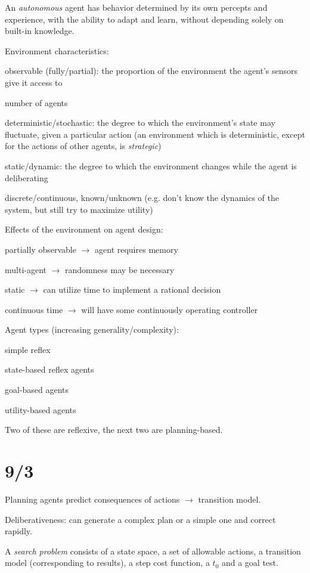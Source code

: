 \documentclass[12pt]{article}
\begin{document}
An \textit{autonomous} agent has behavior determined by its own percepts and experience, with the ability to adapt and learn, without depending solely on built-in knowledge.

\noindent
Environment characteristics:

observable (fully/partial): the proportion of the environment the agent's sensors give it access to

number of agents

deterministic/stochastic: the degree to which the environment's state may fluctuate, given a particular action (an environment which is deterministic, except for the actions of other agents, is \textit{strategic})

static/dynamic: the degree to which the environment changes while the agent is deliberating

discrete/continuous, known/unknown (e.g. don't know the dynamics of the system, but still try to maximize utility)

\noindent
Effects of the environment on agent design:

partially observable $\to$ agent requires memory

multi-agent $\to$ randomness may be necessary

static $\to$ can utilize time to implement a rational decision

continuous time $\to$ will have some continuously operating controller

\noindent
Agent types (increasing generality/complexity):

simple reflex

state-based reflex agents

goal-based agents

utility-based agents

\noindent
Two of these are reflexive, the next two are planning-based.

\section{9/3}

Planning agents predict consequences of actions $\to$ transition model.

Deliberativeness: can generate a complex plan or a simple one and correct rapidly.

A \textit{search problem} consists of a state space, a set of allowable actions, a transition model (corresponding to results), a step cost function, a $t_0$ and a goal test.
\end{document}
